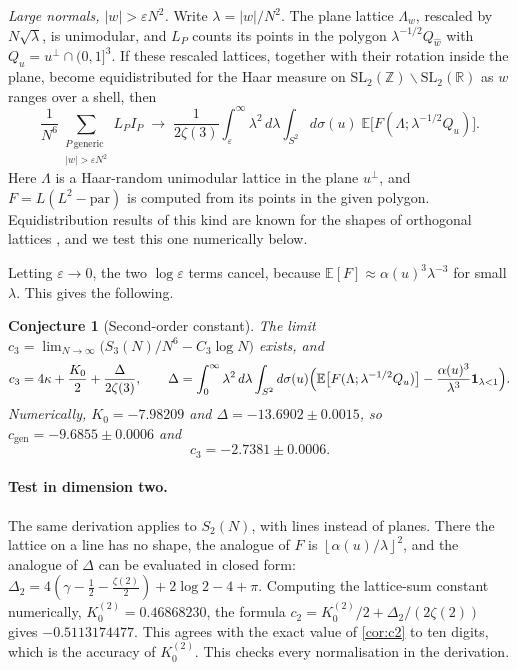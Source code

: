 \documentclass[11pt]{article}
\newtheorem{conjecture}[theorem]{Conjecture}
\theoremstyle{definition}
\newcommand{\Z}{\mathbb{Z}}
\newcommand{\R}{\mathbb{R}}
\newcommand{\floor}[1]{\left\lfloor #1 \right\rfloor}
\newcommand{\abs}[1]{\left\lvert #1 \right\rvert}
\begin{document}
\emph{Large normals, $\abs w>\varepsilon N^2$.} Write $\lambda=\abs w/N^2$. The plane lattice $\Lambda_w$, rescaled by $N\sqrt\lambda$, is unimodular, and $L_P$ counts its points in the polygon $\lambda^{-1/2}Q_{\hat w}$ with $Q_u=u^\perp\cap(0,1]^3$. If these rescaled lattices, together with their rotation inside the plane, become equidistributed for the Haar measure on $\mathrm{SL}_2(\Z)\backslash\mathrm{SL}_2(\R)$ as $w$ ranges over a shell, then
\[
\frac{1}{N^6}\sum_{\substack{P\ \text{generic}\\ \abs w>\varepsilon N^2}}L_PI_P\;\longrightarrow\;\frac{1}{2\zeta(3)}\int_\varepsilon^\infty\lambda^2\,d\lambda\int_{S^2}d\sigma(u)\;\mathbb{E}\bigl[F(\Lambda;\lambda^{-1/2}Q_u)\bigr].
\]
Here $\Lambda$ is a Haar-random unimodular lattice in the plane $u^\perp$, and $F=L(L^2-\mathrm{par})$ is computed from its points in the given polygon. Equidistribution results of this kind are known for the shapes of orthogonal lattices \cite{AES}, and we test this one numerically below.

Letting $\varepsilon\to0$, the two $\log\varepsilon$ terms cancel, because $\mathbb E[F]\approx\alpha(u)^3\lambda^{-3}$ for small $\lambda$. This gives the following.

\begin{conjecture}[Second-order constant]\label{conj:c3}
The limit $c_3=\lim_{N\to\infty}\bigl(S_3(N)/N^6-C_3\log N\bigr)$ exists, and
\[
c_3=4\kappa+\frac{K_0}{2}+\frac{\Delta}{2\zeta(3)},\qquad
\Delta=\int_0^\infty\lambda^2\,d\lambda\int_{S^2}d\sigma(u)\Bigl(\mathbb{E}\bigl[F(\Lambda;\lambda^{-1/2}Q_u)\bigr]-\frac{\alpha(u)^3}{\lambda^3}\mathbf 1_{\lambda<1}\Bigr).
\]
Numerically, $K_0=-7.98209$ and $\Delta=-13.6902\pm0.0015$, so $c_{\mathrm{gen}}=-9.6855\pm0.0006$ and
\[
c_3=-2.7381\pm0.0006 .
\]
\end{conjecture}

\paragraph{Test in dimension two.} The same derivation applies to $S_2(N)$, with lines instead of planes. There the lattice on a line has no shape, the analogue of $F$ is $\floor{\alpha(u)/\lambda}^2$, and the analogue of $\Delta$ can be evaluated in closed form: $\Delta_2=4(\gamma-\frac12-\frac{\zeta(2)}2)+2\log2-4+\pi$. Computing the lattice-sum constant numerically, $K_0^{(2)}=0.46868230$, the formula $c_2=K_0^{(2)}/2+\Delta_2/(2\zeta(2))$ gives $-0.5113174477$. This agrees with the exact value of \cref{cor:c2} to ten digits, which is the accuracy of $K_0^{(2)}$. This checks every normalisation in the derivation.
\end{document}
